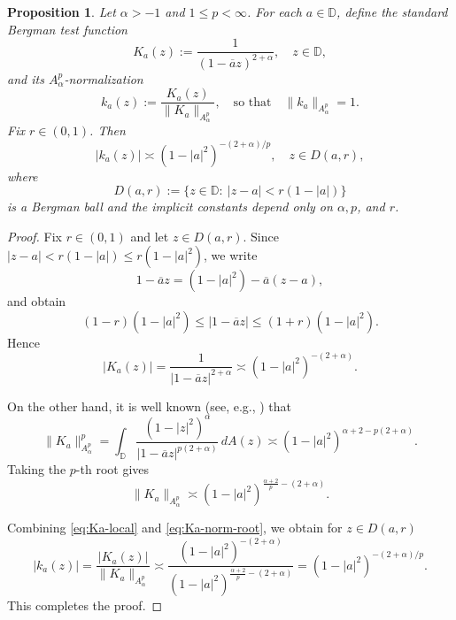 \documentclass[preprint,12pt]{elsarticle}
\numberwithin{equation}{section}
\newtheorem{proposition}{Proposition}[section]
\theoremstyle{remark}
\begin{document}
\begin{proposition}\label{prop:test-function-estimate}
Let $\alpha>-1$ and $1\le p<\infty$. For each $a\in\mathbb D$, define the standard
Bergman test function
\begin{equation*}
K_a(z):=\frac{1}{(1-\overline a z)^{2+\alpha}},\quad z\in\mathbb D,
\end{equation*}
and its $A_\alpha^p$-normalization
\begin{equation*}
k_a(z):=\frac{K_a(z)}{\|K_a\|_{A_\alpha^p}},
\quad\text{so that}\quad \|k_a\|_{A_\alpha^p}=1.
\end{equation*}
Fix $r\in(0,1)$. Then
\begin{equation*}
|k_a(z)| \asymp (1-|a|^2)^{-(2+\alpha)/p},
\quad z\in D(a,r),
\end{equation*}
where
\begin{equation*}
D(a,r):=\{z\in\mathbb D:\ |z-a|<r(1-|a|)\}
\end{equation*}
is a Bergman ball and the implicit constants depend only on $\alpha,p$, and $r$.
\end{proposition}

\begin{proof}
Fix $r\in(0,1)$ and let $z\in D(a,r)$. Since $|z-a|<r(1-|a|)\le r(1-|a|^2)$, we write
\begin{equation*}
1-\overline a z=(1-|a|^2)-\overline a (z-a),
\end{equation*}
and obtain
\begin{equation*}
(1-r)(1-|a|^2)\le |1-\overline a z|\le (1+r)(1-|a|^2).
\end{equation*}
Hence
\begin{equation}\label{eq:Ka-local}
|K_a(z)|=\frac{1}{|1-\overline a z|^{2+\alpha}}
\asymp (1-|a|^2)^{-(2+\alpha)}.
\end{equation}

On the other hand, it is well known (see, e.g., \cite[Ch.~2]{Zhu2005}) that
\begin{equation}\label{eq:Ka-norm}
\|K_a\|_{A_\alpha^p}^p
= \int_{\mathbb D} \frac{(1-|z|^2)^\alpha}{|1-\overline a z|^{p(2+\alpha)}}\,dA(z)
\asymp (1-|a|^2)^{\alpha+2 - p(2+\alpha)}.
\end{equation}
Taking the $p$-th root gives
\begin{equation}\label{eq:Ka-norm-root}
\|K_a\|_{A_\alpha^p}
\asymp (1-|a|^2)^{\frac{\alpha+2}{p}-(2+\alpha)}.
\end{equation}

Combining \eqref{eq:Ka-local} and \eqref{eq:Ka-norm-root}, we obtain for $z\in D(a,r)$
\begin{equation*}
|k_a(z)|
=\frac{|K_a(z)|}{\|K_a\|_{A_\alpha^p}}
\asymp
\frac{(1-|a|^2)^{-(2+\alpha)}}{(1-|a|^2)^{\frac{\alpha+2}{p}-(2+\alpha)}}
=(1-|a|^2)^{-(2+\alpha)/p}.
\end{equation*}
This completes the proof.
\end{proof}
\end{document}
